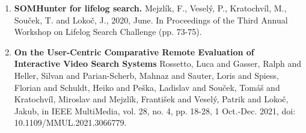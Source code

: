 \begin{enumerate}
	\item \textbf{SOMHunter for lifelog search.} Mejzlík, F., Veselý, P., Kratochvíl, M., Souček, T. and Lokoč, J., 2020, June. In Proceedings of the Third Annual Workshop on Lifelog Search Challenge (pp. 73-75).
	\item \textbf{On the User-Centric Comparative Remote Evaluation of Interactive Video Search Systems} Rossetto, Luca and Gasser, Ralph and Heller, Silvan and Parian-Scherb, Mahnaz and Sauter, Loris and Spiess, Florian and Schuldt, Heiko and Peška, Ladislav and Souček, Tomáš and Kratochvíl, Miroslav and Mejzlík, František and Veselý, Patrik and Lokoč, Jakub, in IEEE MultiMedia, vol. 28, no. 4, pp. 18-28, 1 Oct.-Dec. 2021, doi: 10.1109/MMUL.2021.3066779.
\end{enumerate}
